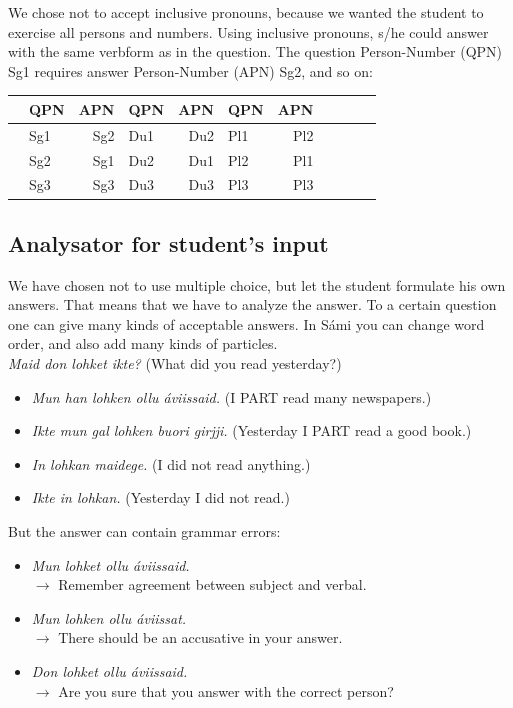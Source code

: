 \documentclass[a4paper,12pt]{article}
\begin{document}
We chose not to accept inclusive pronouns, because we wanted the student to exercise all persons and numbers. Using inclusive pronouns, s/he could answer with the same verbform as in the question. The question Person-Number (QPN) Sg1 requires answer Person-Number (APN) Sg2, and so on:\\


\begin{tabular}[t]{rlrlrlrlrlr}
&QPN &APN &QPN &APN &QPN &APN \\
\hline
&Sg1 &Sg2 &Du1 &Du2 &Pl1 &Pl2 \\
&Sg2 &Sg1 &Du2 &Du1 &Pl2 &Pl1 \\
&Sg3 &Sg3 &Du3 &Du3 &Pl3 &Pl3 \\
\end{tabular}

\subsection{Analysator for student's input}\label{sentencefeedback}
We have chosen not to use multiple choice, but let the student formulate his own answers. That means that we have to analyze the answer. To a certain question one can give many kinds of acceptable answers. In Sámi you can change word order, and also add many kinds of particles.\\

\textit{Maid don lohket ikte?} (What did you read yesterday?)
\begin{itemize}
\item \textit{Mun han lohken ollu áviissaid.} (I PART read many newspapers.)
\item \textit{Ikte mun gal lohken buori girjji.} (Yesterday I PART read a good book.)
\item \textit{In lohkan maidege.} (I did not read anything.)
\item \textit{Ikte in lohkan.} (Yesterday I did not read.)
\end{itemize}


But the answer can contain grammar errors:
\begin{itemize}
\item \textit{Mun lohket ollu áviissaid.} \\ $\rightarrow$ Remember agreement between subject and verbal.  
\item \textit{Mun lohken ollu áviissat.} \\ $\rightarrow$ There should be an accusative in your answer. 
\item \textit{Don lohket ollu áviissaid.} \\ $\rightarrow$ Are you sure that you answer with the correct person?  
\end{itemize}
\end{document}
